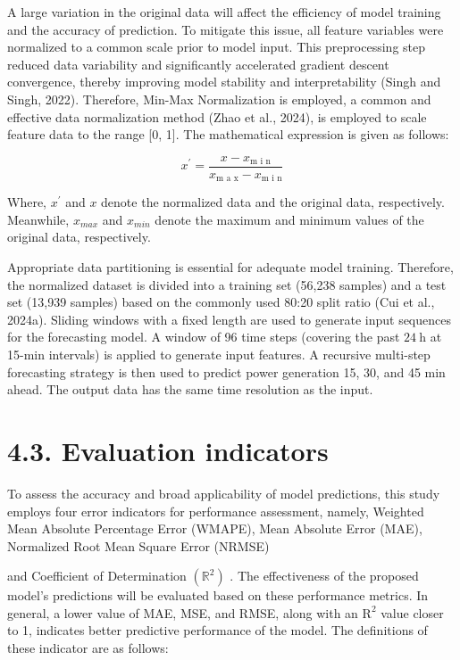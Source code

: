 \documentclass[
  10
]{article}
\begin{document}
A large variation in the original data will affect the efficiency of
model training and the accuracy of prediction. To mitigate this issue,
all feature variables were normalized to a common scale prior to model
input. This preprocessing step reduced data variability and
significantly accelerated gradient descent convergence, thereby
improving model stability and interpretability (Singh and Singh, 2022).
Therefore, Min-Max Normalization is employed, a common and effective
data normalization method (Zhao et al., 2024), is employed to scale
feature data to the range {[}0, 1{]}. The mathematical expression is
given as follows:

\[
x ^ {\prime} = \frac {x - x _ {\text {m i n}}}{x _ {\text {m a x}} - x _ {\text {m i n}}} \tag {36}
\]

Where, \(x ^ { \prime }\) and \(x\) denote the normalized data and the
original data, respectively. Meanwhile, \(x _ { m a x }\) and
\(x _ { m i n }\) denote the maximum and minimum values of the original
data, respectively.

Appropriate data partitioning is essential for adequate model training.
Therefore, the normalized dataset is divided into a training set (56,238
samples) and a test set (13,939 samples) based on the commonly used
80:20 split ratio (Cui et al., 2024a). Sliding windows with a fixed
length are used to generate input sequences for the forecasting model. A
window of 96 time steps (covering the past \(2 4 \ \mathrm { h }\) at
15-min intervals) is applied to generate input features. A recursive
multi-step forecasting strategy is then used to predict power generation
15, 30, and 45 min ahead. The output data has the same time resolution
as the input.

\section{4.3. Evaluation indicators}\label{evaluation-indicators}

To assess the accuracy and broad applicability of model predictions,
this study employs four error indicators for performance assessment,
namely, Weighted Mean Absolute Percentage Error (WMAPE), Mean Absolute
Error (MAE), Normalized Root Mean Square Error (NRMSE)

and Coefficient of Determination \(( \mathbb { R } ^ { 2 } )\) . The
effectiveness of the proposed model's predictions will be evaluated
based on these performance metrics. In general, a lower value of MAE,
MSE, and RMSE, along with an \(\mathrm { R } ^ { 2 }\) value closer to
1, indicates better predictive performance of the model. The definitions
of these indicator are as follows:
\end{document}
